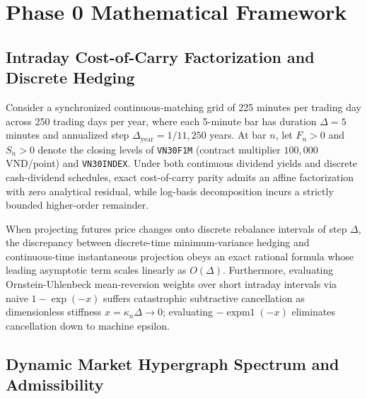 \section{Phase 0 Mathematical Framework}
\label{sec:method}

\subsection{Intraday Cost-of-Carry Factorization and Discrete Hedging}
\label{sec:method_carry}

Consider a synchronized continuous-matching grid of 225 minutes per trading day across 250 trading days per year, where each 5-minute bar has duration $\Delta = 5$ minutes and annualized step $\Delta_{\mathrm{year}} = 1 / 11{,}250$ years. At bar $n$, let $F_n > 0$ and $S_n > 0$ denote the closing levels of \texttt{VN30F1M} (contract multiplier $100{,}000$ VND/point) and \texttt{VN30INDEX}. Under both continuous dividend yields and discrete cash-dividend schedules, exact cost-of-carry parity admits an affine factorization with zero analytical residual, while log-basis decomposition incurs a strictly bounded higher-order remainder.

When projecting futures price changes onto discrete rebalance intervals of step $\Delta$, the discrepancy between discrete-time minimum-variance hedging and continuous-time instantaneous projection obeys an exact rational formula whose leading asymptotic term scales linearly as $O(\Delta)$. Furthermore, evaluating Ornstein-Uhlenbeck mean-reversion weights over short intraday intervals via naive $1 - \exp(-x)$ suffers catastrophic subtractive cancellation as dimensionless stiffness $x = \kappa_n \Delta \to 0$; evaluating $-\operatorname{expm1}(-x)$ eliminates cancellation down to machine epsilon.

\subsection{Dynamic Market Hypergraph Spectrum and Admissibility}
\label{sec:method_hypergraph}

